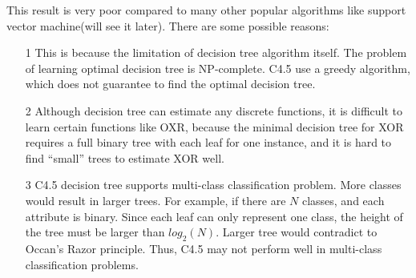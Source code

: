 \documentclass[a4paper,11pt]{article}
\begin{document}
This result is very poor compared to many other popular algorithms like support vector machine(will see it later). There are some possible reasons:\\
\begin{enumerate}
\item[1] This is because the limitation of decision tree algorithm itself. The problem of learning optimal decision tree is NP-complete\cite{DT_NPC}. C4.5 use a greedy algorithm, which does not guarantee to find the optimal decision tree.\\
\item[2] Although decision tree can estimate any discrete functions, it is difficult to learn certain functions like OXR, because the minimal decision tree for XOR requires a full binary tree with each leaf for one instance, and it is hard to find ``small'' trees to estimate XOR well.
\item[3] C4.5 decision tree supports multi-class classification problem. More classes would result in larger trees. For example, if there are $N$ classes, and each attribute is binary. Since each leaf can only represent one class, the height of the tree must be larger than $log_2(N)$. Larger tree would contradict to Occan's Razor principle. Thus, C4.5 may not perform well in multi-class classification problems.
\end{enumerate}
\end{document}
